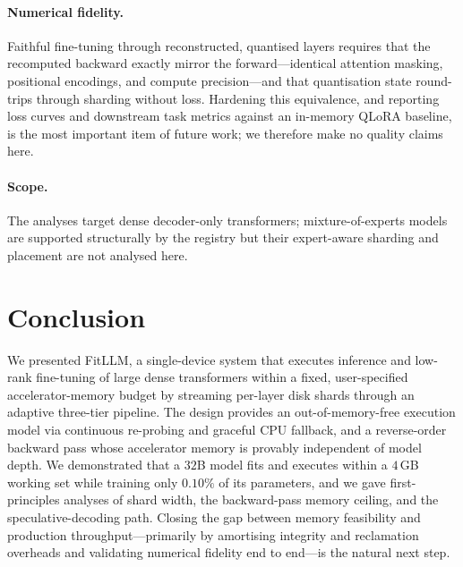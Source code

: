 \documentclass{article}
\begin{document}
\paragraph{Numerical fidelity.} Faithful fine-tuning through reconstructed,
quantised layers requires that the recomputed backward exactly mirror the
forward---identical attention masking, positional encodings, and compute
precision---and that quantisation state round-trips through sharding without
loss. Hardening this equivalence, and reporting loss curves and downstream task
metrics against an in-memory QLoRA baseline, is the most important item of future
work; we therefore make no quality claims here.

\paragraph{Scope.} The analyses target dense decoder-only transformers;
mixture-of-experts models are supported structurally by the registry but their
expert-aware sharding and placement are not analysed here.

\section{Conclusion}
\label{sec:conclusion}

We presented FitLLM, a single-device system that executes inference and low-rank
fine-tuning of large dense transformers within a fixed, user-specified
accelerator-memory budget by streaming per-layer disk shards through an adaptive
three-tier pipeline. The design provides an out-of-memory-free execution model
via continuous re-probing and graceful CPU fallback, and a reverse-order backward
pass whose accelerator memory is provably independent of model depth. We
demonstrated that a $32$B model fits and executes within a $4$\,GB working set
while training only $0.10\%$ of its parameters, and we gave first-principles
analyses of shard width, the backward-pass memory ceiling, and the
speculative-decoding path. Closing the gap between memory feasibility and
production throughput---primarily by amortising integrity and reclamation
overheads and validating numerical fidelity end to end---is the natural next
step.
\end{document}
